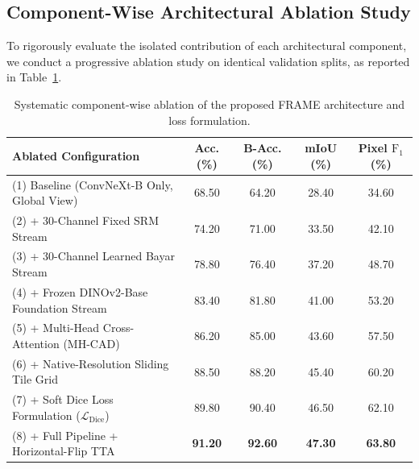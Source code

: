 \subsection{Component-Wise Architectural Ablation Study}
To rigorously evaluate the isolated contribution of each architectural component, we conduct a progressive ablation study on identical validation splits, as reported in Table~\ref{tab:ablation}.

\begin{table}[t]
\centering\small
\caption{Systematic component-wise ablation of the proposed FRAME architecture and loss formulation.}
\label{tab:ablation}
\setlength{\tabcolsep}{4pt}
\renewcommand{\arraystretch}{1.15}
\begin{tabular*}{\textwidth}{@{\extracolsep{\fill}}lcccc@{}}
\toprule
Ablated Configuration & Acc. (\%) & B-Acc. (\%) & mIoU (\%) & Pixel $\mathrm{F}_1$ (\%) \\
\midrule
(1) Baseline (ConvNeXt-B Only, Global View) & 68.50 & 64.20 & 28.40 & 34.60 \\
(2) + 30-Channel Fixed SRM Stream & 74.20 & 71.00 & 33.50 & 42.10 \\
(3) + 30-Channel Learned Bayar Stream & 78.80 & 76.40 & 37.20 & 48.70 \\
(4) + Frozen DINOv2-Base Foundation Stream & 83.40 & 81.80 & 41.00 & 53.20 \\
(5) + Multi-Head Cross-Attention (MH-CAD) & 86.20 & 85.00 & 43.60 & 57.50 \\
(6) + Native-Resolution Sliding Tile Grid & 88.50 & 88.20 & 45.40 & 60.20 \\
(7) + Soft Dice Loss Formulation ($\mathcal{L}_{\mathrm{Dice}}$) & 89.80 & 90.40 & 46.50 & 62.10 \\
(8) + Full Pipeline + Horizontal-Flip TTA & \textbf{91.20} & \textbf{92.60} & \textbf{47.30} & \textbf{63.80} \\
\bottomrule
\end{tabular*}
\end{table}

